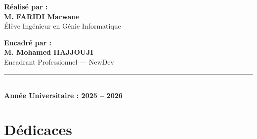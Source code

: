 \documentclass[12pt,a4paper,twoside,openright]{report}
\begin{document}
\begin{titlepage}
\begin{center}
      \vspace{1.8cm}

      \noindent
      \begin{minipage}[t]{0.48\textwidth}
        \begin{flushleft} \large
          \textbf{\color{primaryNavy}R\'ealis\'e par :}\\[0.15cm]
          \textbf{M. FARIDI Marwane}\\[0.1cm]
          \small \'El\`eve Ing\'enieur en G\'enie Informatique
        \end{flushleft}
      \end{minipage}
      \hfill
      \begin{minipage}[t]{0.48\textwidth}
        \begin{flushright} \large
          \textbf{\color{primaryNavy}Encadr\'e par :}\\[0.15cm]
          \textbf{M. Mohamed HAJJOUJI}\\[0.1cm]
          \small Encadrant Professionnel --- NewDev
        \end{flushright}
      \end{minipage}

      \vfill
      {\color{secondaryBlue}\rule{0.65\textwidth}{0.8pt}}\\[0.25cm]
      {\bfseries\color{darkSlate} Ann\'ee Universitaire : 2025 -- 2026}
    \end{center}
  \end{titlepage}

  \setcounter{page}{1}

  \chapter*{D\'edicaces}
\end{document}
